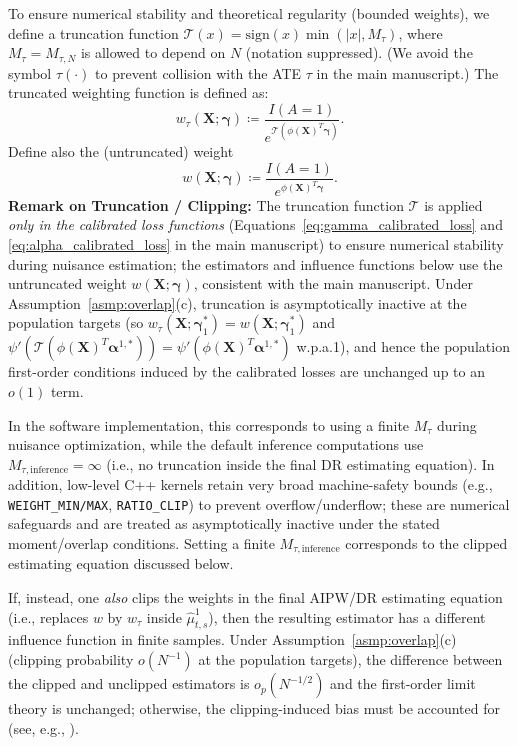 \documentclass{article}
\begin{document}
To ensure numerical stability and theoretical regularity (bounded weights), we define a truncation function $\mathcal{T}(x) = \text{sign}(x)\min(|x|, M_{\tau})$, where $M_{\tau}=M_{\tau,N}$ is allowed to depend on $N$ (notation suppressed). (We avoid the symbol $\tau(\cdot)$ to prevent collision with the ATE $\tau$ in the main manuscript.)
The truncated weighting function is defined as:
\[
w_\tau(\boldsymbol{X}; \boldsymbol{\gamma}) \coloneqq \frac{I(A=1)}{e^{\mathcal{T}(\phi(\boldsymbol{X})^T \boldsymbol{\gamma})}}.
\]
Define also the (untruncated) weight
\[
w(\boldsymbol{X}; \boldsymbol{\gamma}) \coloneqq \frac{I(A=1)}{e^{\phi(\boldsymbol{X})^T \boldsymbol{\gamma}}}.
\]
\textbf{Remark on Truncation / Clipping:} The truncation function $\mathcal{T}$ is applied \textit{only in the calibrated loss functions} (Equations~\eqref{eq:gamma_calibrated_loss} and \eqref{eq:alpha_calibrated_loss} in the main manuscript) to ensure numerical stability during nuisance estimation; the estimators and influence functions below use the untruncated weight $w(\boldsymbol{X};\boldsymbol{\gamma})$, consistent with the main manuscript. Under Assumption~\ref{asmp:overlap}(c), truncation is asymptotically inactive at the population targets (so $w_\tau(\boldsymbol{X};\boldsymbol{\gamma}_1^*) = w(\boldsymbol{X};\boldsymbol{\gamma}_1^*)$ and $\psi'(\mathcal{T}(\phi(\boldsymbol{X})^T\boldsymbol{\alpha}^{1,*}))=\psi'(\phi(\boldsymbol{X})^T\boldsymbol{\alpha}^{1,*})$ w.p.a.1), and hence the population first-order conditions induced by the calibrated losses are unchanged up to an $o(1)$ term.

In the software implementation, this corresponds to using a finite $M_{\tau}$ during nuisance optimization, while the default inference computations use $M_{\tau,\mathrm{inference}}=\infty$ (i.e., no truncation inside the final DR estimating equation). In addition, low-level C++ kernels retain very broad machine-safety bounds (e.g., \texttt{WEIGHT\_MIN/MAX}, \texttt{RATIO\_CLIP}) to prevent overflow/underflow; these are numerical safeguards and are treated as asymptotically inactive under the stated moment/overlap conditions. Setting a finite $M_{\tau,\mathrm{inference}}$ corresponds to the clipped estimating equation discussed below.

If, instead, one \emph{also} clips the weights in the final AIPW/DR estimating equation (i.e., replaces $w$ by $w_\tau$ inside $\widehat{\mu}^1_{t,s}$), then the resulting estimator has a different influence function in finite samples. Under Assumption~\ref{asmp:overlap}(c) (clipping probability $o(N^{-1})$ at the population targets), the difference between the clipped and unclipped estimators is $o_p(N^{-1/2})$ and the first-order limit theory is unchanged; otherwise, the clipping-induced bias must be accounted for (see, e.g., \citet{tan2020model}).
\end{document}
